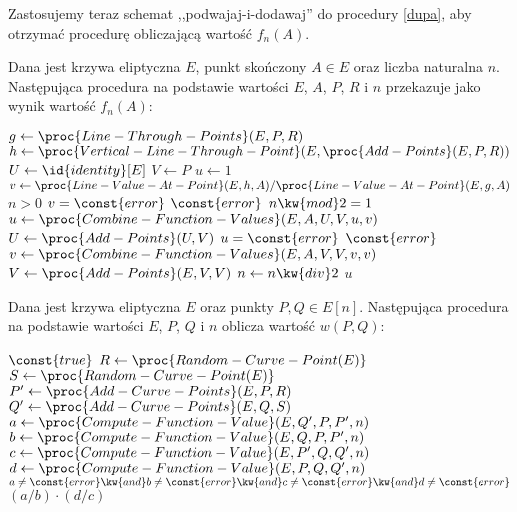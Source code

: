 Zastosujemy teraz schemat ,,podwajaj-i-dodawaj'' do procedury \ref{dupa},
aby otrzymać procedurę obliczającą wartość $f_n(A)$.

\begin{algorithm}
Dana jest krzywa eliptyczna $E$,
punkt skończony $A \in E$ oraz liczba naturalna $n$.
Następująca procedura
na podstawie wartości $E$, $A$, $P$, $R$ i $n$
przekazuje jako wynik
wartość $f_n(A)$:

\begin{codebox}
\li
    $g \gets \proc{Line-Through-Points}(E, P, R)$
\li
    $h \gets \proc{Vertical-Line-Through-Point}(E, \proc{Add-Points}(E, P, R))$
\li
    $U \gets \id{identity}[E]$
\li
    $V \gets P$
\li
    $u \gets 1$
\li
    $v \gets \proc{Line-Value-At-Point}(E, h, A) /
            \proc{Line-Value-At-Point}(E, g, A)$
\li
    \While $n > 0$
\li
        \Do
            \If $v = \const{error}$
\li
                \Then
                    \Return $\const{error}$
                \End
\li
            \If $n \kw{ mod } 2 = 1$
\li
                \Then
                    $u \gets \proc{Combine-Function-Values}(E, A, U, V, u, v)$
\li
                    $U \gets \proc{Add-Points}(U, V)$
\li
                    \If $u = \const{error}$
\li
                        \Then
                            \Return $\const{error}$
                        \End
                \End
\li
            $v \gets \proc{Combine-Function-Values}(E, A, V, V, v, v)$
\li
            $V \gets \proc{Add-Points}(E, V, V)$
\li
            $n \gets n \kw{ div } 2$
        \End
\li
    \Return $u$
\end{codebox}
\end{algorithm}

\begin{algorithm}
Dana jest krzywa eliptyczna $E$ oraz punkty $P,Q \in E[n]$.
Następująca procedura
na podstawie wartości $E$, $P$, $Q$ i $n$
oblicza wartość
$w(P, Q)$:

\begin{codebox}
\li
    \While $\const{true}$
\li
        \Do
            $R \gets \proc{Random-Curve-Point(E)}$
\li
            $S \gets \proc{Random-Curve-Point(E)}$
\li
            $P' \gets \proc{Add-Curve-Points}(E, P, R)$
\li
            $Q' \gets \proc{Add-Curve-Points}(E, Q, S)$
\li
            $a \gets \proc{Compute-Function-Value}(E, Q', P, P', n)$
\li
            $b \gets \proc{Compute-Function-Value}(E, Q, P, P', n)$
\li
            $c \gets \proc{Compute-Function-Value}(E, P', Q, Q', n)$
\li
            $d \gets \proc{Compute-Function-Value}(E, P, Q, Q', n)$
\li
            \If $a \neq \const{error} \kw{ and } b \neq \const{error} \kw{ and }
                    c \neq \const{error} \kw{ and } d \neq \const{error}$
\li
                \Then
                    \Return $(a / b)\cdot(d / c)$
                \End
        \End
\end{codebox}
\end{algorithm}
